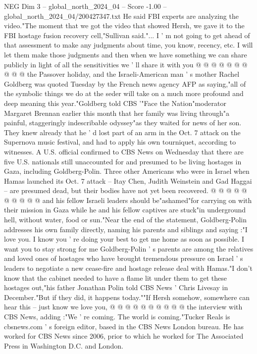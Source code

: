 \begin{textsample}{NEG Dim 3 – global\_north\_2024\_04 – Score -1.00 – global\_north\_2024\_04/200427347.txt}
He said FBI experts are analyzing the video."The moment that we got the video that showed Hersh, we gave it to the FBI hostage fusion recovery cell,"Sullivan said."...
I ' m not going to get ahead of that assessment to make any judgments about time, you know, recency, etc.
I will let them make those judgments and then when we have something we can share publicly in light of all the sensitivities we ' ll share it with you @ @ @ @ @ @ @ @ @ @ the Passover holiday, and the Israeli-American man ' s mother Rachel Goldberg was quoted Tuesday by the French news agency AFP as saying,"all of the symbolic things we do at the seder will take on a much more profound and deep meaning this year."Goldberg told CBS '"Face the Nation"moderator Margaret Brennan earlier this month that her family was living through"a painful, staggeringly indescribable odyssey"as they waited for news of her son.
They knew already that he ' d lost part of an arm in the Oct. 7 attack on the Supernova music festival, and had to apply his own tourniquet, according to witnesses.
A U.S. official confirmed to CBS News on Wednesday that there are five U.S. nationals still unaccounted for and presumed to be living hostages in Gaza, including Goldberg-Polin.
Three other Americans who were in Israel when Hamas launched its Oct. 7 attack -- Itay Chen, Judith Weinstein and Gad Haggai -- are presumed dead, but their bodies have not yet been recovered. @ @ @ @ @ @ @ @ @ @ and his fellow Israeli leaders should be"ashamed"for carrying on with their mission in Gaza while he and his fellow captives are stuck"in underground hell, without water, food or sun."Near the end of the statement, Goldberg-Polin addresses his own family directly, naming his parents and siblings and saying :"I love you.
I know you ' re doing your best to get me home as soon as possible.
I want you to stay strong for me Goldberg-Polin ' s parents are among the relatives and loved ones of hostages who have brought tremendous pressure on Israel ' s leaders to negotiate a new cease-fire and hostage release deal with Hamas."I don't know that the cabinet needed to have a flame lit under them to get these hostages out,"his father Jonathan Polin told CBS News ' Chris Livesay in December."But if they did, it happens today.""If Hersh somehow, somewhere can hear this -- just know we love you, @ @ @ @ @ @ @ @ @ @ the interview with CBS News, adding :"We ' re coming.
The world is coming."Tucker Reals is cbsnews.com ' s foreign editor, based in the CBS News London bureau.
He has worked for CBS News since 2006, prior to which he worked for The Associated Press in Washington D.C. and London.

\end{textsample}
